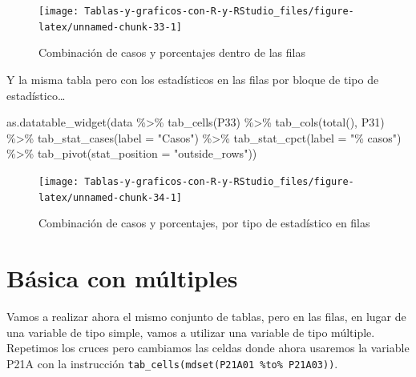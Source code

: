 \documentclass[
]{book}
\newenvironment{Shaded}{\begin{snugshade}}{\end{snugshade}}
\newcommand{\AttributeTok}[1]{\textcolor[rgb]{0.77,0.63,0.00}{#1}}
\newcommand{\FunctionTok}[1]{\textcolor[rgb]{0.00,0.00,0.00}{#1}}
\newcommand{\NormalTok}[1]{#1}
\newcommand{\SpecialCharTok}[1]{\textcolor[rgb]{0.00,0.00,0.00}{#1}}
\newcommand{\StringTok}[1]{\textcolor[rgb]{0.31,0.60,0.02}{#1}}
\begin{document}
\begin{figure}[H]

{\centering \texttt{[image: Tablas-y-graficos-con-R-y-RStudio\_files/figure-latex/unnamed-chunk-33-1]} 

}

\caption{Combinación de casos y porcentajes dentro de las filas}\label{fig:unnamed-chunk-33}
\end{figure}

Y la misma tabla pero con los estadísticos en las filas por bloque de tipo de estadístico\ldots{}

\begin{Shaded}
\begin{Highlighting}[]
\FunctionTok{as.datatable\_widget}\NormalTok{(data }\SpecialCharTok{\%\textgreater{}\%}
  \FunctionTok{tab\_cells}\NormalTok{(P33) }\SpecialCharTok{\%\textgreater{}\%}
  \FunctionTok{tab\_cols}\NormalTok{(}\FunctionTok{total}\NormalTok{(), P31) }\SpecialCharTok{\%\textgreater{}\%}
  \FunctionTok{tab\_stat\_cases}\NormalTok{(}\AttributeTok{label =} \StringTok{"Casos"}\NormalTok{) }\SpecialCharTok{\%\textgreater{}\%}
  \FunctionTok{tab\_stat\_cpct}\NormalTok{(}\AttributeTok{label =} \StringTok{"\% casos"}\NormalTok{) }\SpecialCharTok{\%\textgreater{}\%}
  \FunctionTok{tab\_pivot}\NormalTok{(}\AttributeTok{stat\_position =} \StringTok{"outside\_rows"}\NormalTok{))}
\end{Highlighting}
\end{Shaded}

\begin{figure}[H]

{\centering \texttt{[image: Tablas-y-graficos-con-R-y-RStudio\_files/figure-latex/unnamed-chunk-34-1]} 

}

\caption{Combinación de casos y porcentajes, por tipo de estadístico en filas}\label{fig:unnamed-chunk-34}
\end{figure}

\hypertarget{buxe1sica-con-muxfaltiples}{%
\section{Básica con múltiples}\label{buxe1sica-con-muxfaltiples}}

Vamos a realizar ahora el mismo conjunto de tablas, pero en las filas, en lugar de una variable de tipo simple, vamos a utilizar una variable de tipo múltiple. Repetimos los cruces pero cambiamos las celdas donde ahora usaremos la variable P21A con la instrucción \texttt{tab\_cells(mdset(P21A01\ \%to\%\ P21A03))}.
\end{document}
